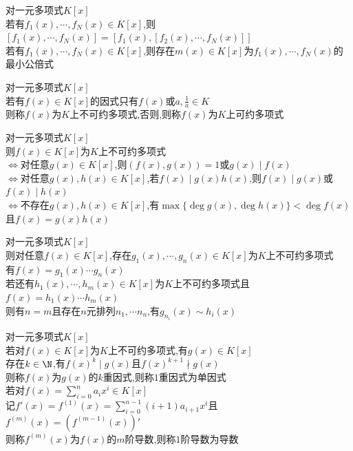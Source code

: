\begin{dingli}
对一元多项式$K[x]$\\
若有$f_1(x),\cdots,f_N(x)\in K[x]$,则$[f_1(x),\cdots,f_N(x)]=[f_1(x),[f_2(x),\cdots,f_N(x)]]$\\
若有$f_1(x),\cdots,f_N(x)\in K[x]$,则存在$m(x)\in K[x]$为$f_1(x),\cdots,f_N(x)$的最小公倍式
\end{dingli}

\begin{dingyi}
对一元多项式$K[x]$\\
若有$f(x)\in K[x]$的因式只有$f(x)$或$a,\frac{1}{a}\in K$\\
则称$f(x)$为$K$上不可约多项式,否则,则称$f(x)$为$K$上可约多项式
\end{dingyi}

\begin{dingli}
对一元多项式$K[x]$\\
则$f(x)\in K[x]$为$K$上不可约多项式\\
$\Leftrightarrow$对任意$g(x)\in K[x]$,则$(f(x),g(x))=1$或$g(x)\mid f(x)$\\
$\Leftrightarrow$对任意$g(x),h(x)\in K[x]$,若$f(x)\mid g(x)h(x)$,则$f(x)\mid g(x)$或$f(x)\mid h(x)$\\
$\Leftrightarrow$不存在$g(x),h(x)\in K[x]$,有$\max\{\deg g(x),\deg h(x)\}<\deg f(x)$且$f(x)=g(x)h(x)$
\end{dingli}

\begin{dingli}
对一元多项式$K[x]$\\
则对任意$f(x)\in K[x]$,存在$g_1(x),\cdots,g_n(x)\in K[x]$为$K$上不可约多项式\\
有$f(x)=g_1(x)\cdots g_n(x)$\\
若还有$h_1(x),\cdots,h_m(x)\in K[x]$为$K$上不可约多项式且$f(x)=h_1(x)\cdots h_m(x)$\\
则有$n=m$且存在$n$元排列$n_1,\cdots n_n$,有$g_{n_i}(x)\sim h_{i}(x)$
\end{dingli}

\begin{dingyi}
对一元多项式$K[x]$\\
若对$f(x)\in K[x]$为$K$上不可约多项式,有$g(x)\in K[x]$\\
存在$k\in \N$,有$f(x)^{k}\mid g(x)$且$f(x)^{k+1}\nmid g(x)$\\
则称$f(x)$为$g(x)$的$k$重因式,则称$1$重因式为单因式\\
若对$f(x)=\sum\limits_{i=0}^{n}a_ix^i\in K[x]$\\
记$f'(x)=f^{(1)}(x)=\sum\limits_{i=0}^{n-1}(i+1)a_{i+1}x^i$且$f^{(m)}(x)=(f^{(m-1)}(x))'$\\
则称$f^{(m)}(x)$为$f(x)$的$m$阶导数,则称$1$阶导数为导数
\end{dingyi}

